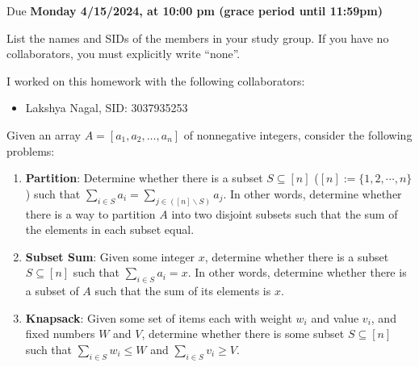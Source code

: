 \documentclass[11pt]{article}
\def\duedate{Monday 4/15/2024, at 10:00 pm (grace period until 11:59pm)}
\begin{document}
\maketitle


Due \textbf{\duedate}

List the names and SIDs of the members in your study group.
If you have no collaborators, you must explicitly write ``none''.

\begin{solution} I worked on this homework with the following collaborators:
\begin{itemize}
    \item Lakshya Nagal, SID: 3037935253
\end{itemize}
\end{solution}

Given an array $A=[a_1, a_2, \hdots, a_n]$ of nonnegative integers, consider the following problems:
\begin{enumerate}[1]
\item \textbf{Partition}: Determine whether there is a subset $S \subseteq [n]$ ($[n] := \{1,2, \cdots, n\}$) such that $\sum_{i\in S}a_i=\sum_{j\in ([n] \backslash S)}a_j$. In other words, determine whether there is a way to partition $A$ into two disjoint subsets such that the sum of the elements in each subset equal.
\item \textbf{Subset Sum}: Given some integer $x$, determine whether there is a subset $S \subseteq [n]$ such that $\sum_{i\in S}a_i=x$. In other words, determine whether there is a subset of $A$ such that the sum of its elements is $x$.
\item \textbf{Knapsack}: Given some set of items each with weight
$w_i$ and value $v_i$, and fixed numbers $W$ and $V$, determine
whether there is some subset $S\subseteq [n]$ such that $\sum_{i\in S}w_i \leq W$ and $\sum_{i\in S}v_i \geq V$.
\end{enumerate}
\end{document}
